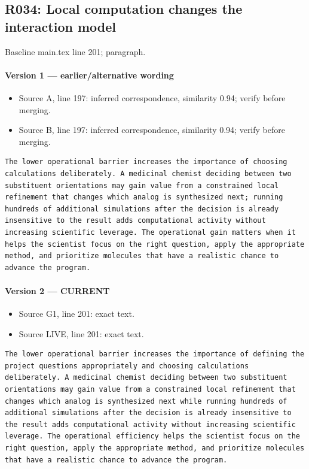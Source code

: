\documentclass[11pt]{article}
\begin{document}
\subsection{R034: Local computation changes the interaction model}

Baseline main.tex line 201; paragraph.

\paragraph{Version 1 --- earlier/alternative wording}

\begin{itemize}[leftmargin=*]
\item Source A, line 197: inferred correspondence, similarity 0.94; verify before merging.
\item Source B, line 197: inferred correspondence, similarity 0.94; verify before merging.
\end{itemize}

\begin{lstlisting}
The lower operational barrier increases the importance of choosing calculations deliberately. A medicinal chemist deciding between two substituent orientations may gain value from a constrained local refinement that changes which analog is synthesized next; running hundreds of additional simulations after the decision is already insensitive to the result adds computational activity without increasing scientific leverage. The operational gain matters when it helps the scientist focus on the right question, apply the appropriate method, and prioritize molecules that have a realistic chance to advance the program.
\end{lstlisting}

\paragraph{Version 2 --- CURRENT}

\begin{itemize}[leftmargin=*]
\item Source G1, line 201: exact text.
\item Source LIVE, line 201: exact text.
\end{itemize}

\begin{lstlisting}
The lower operational barrier increases the importance of defining the project questions appropriately and choosing calculations deliberately. A medicinal chemist deciding between two substituent orientations may gain value from a constrained local refinement that changes which analog is synthesized next while running hundreds of additional simulations after the decision is already insensitive to the result adds computational activity without increasing scientific leverage. The operational efficiency helps the scientist focus on the right question, apply the appropriate method, and prioritize molecules that have a realistic chance to advance the program.
\end{lstlisting}
\end{document}
